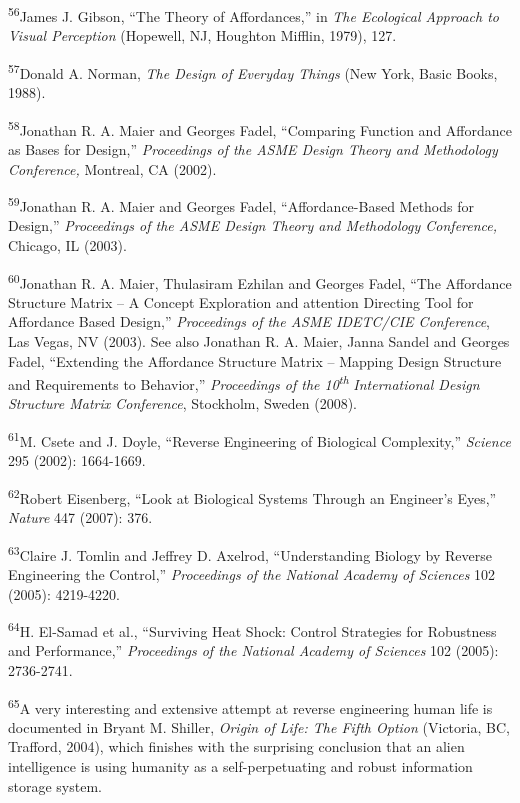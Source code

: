 \textsuperscript{56}James J. Gibson, “The Theory of Affordances,” in
\textit{The Ecological Approach to Visual Perception }(Hopewell, NJ,
Houghton Mifflin, 1979), 127.


\textsuperscript{57}Donald A. Norman, \textit{The Design of Everyday
Things }(New York, Basic Books, 1988).


\textsuperscript{58}Jonathan R. A. Maier and Georges Fadel, “Comparing
Function and Affordance as Bases for Design,” \textit{Proceedings of
the ASME Design Theory and Methodology Conference, }Montreal, CA
(2002).


\textsuperscript{59}Jonathan R. A. Maier and Georges Fadel,
“Affordance-Based Methods for Design,” \textit{Proceedings of the ASME
Design Theory and Methodology Conference, }Chicago, IL (2003).


\textsuperscript{60}Jonathan R. A. Maier, Thulasiram Ezhilan and Georges
Fadel, “The Affordance Structure Matrix – A Concept Exploration and
attention Directing Tool for Affordance Based Design,”
\textit{Proceedings of the ASME IDETC/CIE Conference},\textit{ }Las
Vegas, NV (2003). See also Jonathan R. A. Maier, Janna Sandel and
Georges Fadel, “Extending the Affordance Structure Matrix – Mapping
Design Structure and Requirements to Behavior,” \textit{Proceedings of
the 10}\textit{\textsuperscript{th}}\textit{ International Design
Structure Matrix Conference},\textit{ }Stockholm, Sweden (2008).


\textsuperscript{61}M. Csete and J. Doyle, “Reverse Engineering of
Biological Complexity,” \textit{Science} 295 (2002): 1664-1669.


\textsuperscript{62}Robert Eisenberg, “Look at Biological Systems
Through an Engineer’s Eyes,” \textit{Nature} 447 (2007): 376.


\textsuperscript{63}Claire J. Tomlin and Jeffrey D. Axelrod,
“Understanding Biology by Reverse Engineering the Control,”
\textit{Proceedings of the National Academy of Sciences} 102 (2005):
4219-4220.


\textsuperscript{64}H. El-Samad et al., “Surviving Heat Shock: Control
Strategies for Robustness and Performance,” \textit{Proceedings of the
National Academy of Sciences} 102 (2005): 2736-2741.


\textsuperscript{65}A very interesting and extensive attempt at reverse
engineering human life is documented in Bryant M. Shiller,
\textit{Origin of Life: The Fifth Option} (Victoria, BC, Trafford,
2004), which finishes with the surprising conclusion that an alien
intelligence is using humanity as a self-perpetuating and robust
information storage system.


